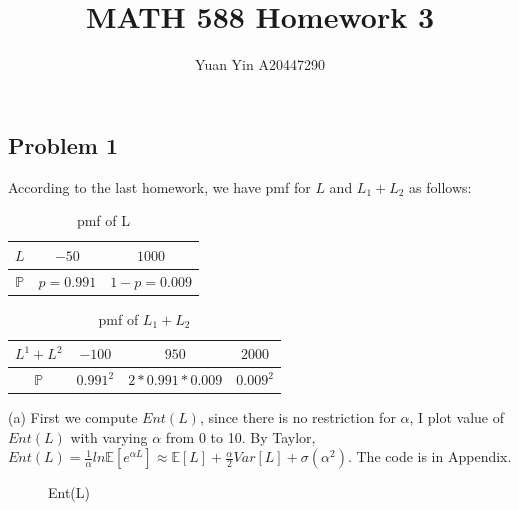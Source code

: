 \documentclass[letterpaper,11pt]{article}
\author{Yuan Yin A20447290}
\title{MATH 588 Homework 3}
\begin{document}
\large
\maketitle
\begin{spacing}{1.2}  %
\section*{Problem 1}

According to the last homework, we have pmf for $L$ and $L_1+L_2$ as follows:

\begin{table}[h]
\centering
\caption{pmf of L}
\begin{tabular}{|c|c|c|}
\hline
$L$ & $-50$ & $1000$\\
\hline
$\mathbb{P}$ & $p=0.991$ & $1-p = 0.009$\\
\hline
\end{tabular}
\end{table}

\begin{table}[h]
\centering
\caption{pmf of $L_1+L_2$}
\begin{tabular}{|c|c|c|c|}
\hline
$L^1+L^2$ & $-100$ & $950$ & $2000$\\
\hline
$\mathbb{P}$ & $0.991^2$ & $2*0.991*0.009$ & $0.009^2$\\
\hline
\end{tabular}
\end{table}

(a)
First we compute $Ent(L)$, since there is no restriction for $\alpha$, I plot value of $Ent(L)$ with varying $\alpha$ from 0 to 10. By Taylor, $Ent(L) = \frac{1}{\alpha}ln\mathbb{E}[e^{\alpha L}] \approx \mathbb{E}[L] + \frac{\alpha}{2} Var[L] + \sigma(\alpha^2)$. The code is in Appendix.

\begin{figure}[h]        
 \caption{\label{1} Ent(L)}      
 \end{figure}


\end{spacing}
\end{document}
